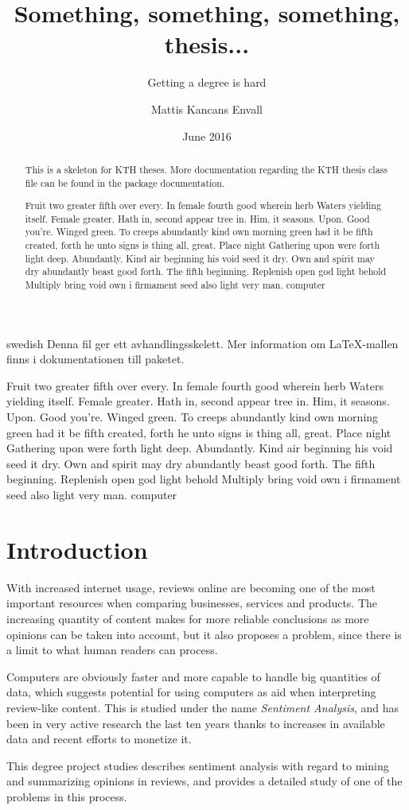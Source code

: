 \documentclass[a4paper,11pt]{kth-mag}
\title{Something, something, something, thesis...}
\subtitle{Getting a degree is hard}
\author{Mattis Kancans Envall}
\date{June 2016}
\newcommand{\loremipsum}{
  {\color{lightgray}
  Fruit two greater fifth over every. In female fourth good wherein herb
  Waters yielding itself. Female greater. Hath in, second appear tree in.
  Him, it seasons. Upon. Good you're. Winged green. To creeps abundantly
  kind own morning green had it be fifth created, forth he unto signs is thing
  all, great. Place night Gathering upon were forth light deep. Abundantly.
  Kind air beginning his void seed it dry. Own and spirit may dry abundantly
  beast good forth. The fifth beginning. Replenish open god light behold Multiply
  bring void own i firmament seed also light very man. \gls{computer}

  }
}
\begin{document}
\frontmatter
\pagestyle{empty}
\removepagenumbers
\maketitle
{}
\begin{abstract}
  This is a skeleton for KTH theses. More documentation
  regarding the KTH thesis class file can be found in
  the package documentation.

\loremipsum
  
\end{abstract}
\clearpage
\begin{foreignabstract}{swedish}
  Denna fil ger ett avhandlingsskelett.
  Mer information om \LaTeX-mallen finns i
  dokumentationen till paketet.

\loremipsum

\end{foreignabstract}
\clearpage
\tableofcontents*

\glsaddall
\printglossaries

\mainmatter
\pagestyle{newchap}
\chapter{Introduction}
With increased internet usage, reviews online are becoming one of the most important resources when comparing businesses, services and products.
The increasing quantity of content makes for more reliable conclusions as more opinions can be taken into account, but it also proposes a problem,
since there is a limit to what human readers can process.

Computers are obviously faster and more capable to handle big quantities of data, which suggests potential for using computers as aid when
interpreting review-like content. This is studied under the name \emph{Sentiment Analysis}, and has been in very active research the last ten years
thanks to increases in available data and recent efforts to monetize it.

This degree project studies describes sentiment analysis with regard to mining and summarizing opinions in reviews, and provides a detailed study of one of the problems in this process.


\end{document}
